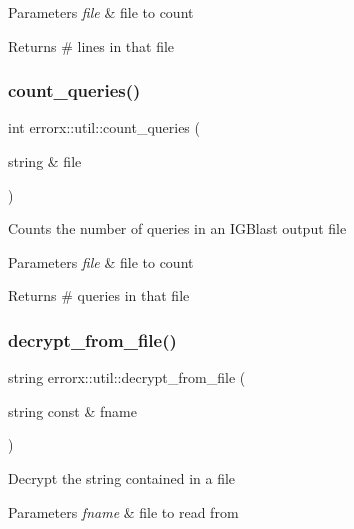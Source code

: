 \begin{DoxyParams}{Parameters}
{\em file} & file to count\\
\hline
\end{DoxyParams}
\begin{DoxyReturn}{Returns}
\# lines in that file 
\end{DoxyReturn}
\mbox{\label{util_8hh_file_a1085374a3cfcdff485fbce90b2aab7e4}} 
\subsubsection{\texorpdfstring{count\+\_\+queries()}{count\_queries()}}
{\footnotesize\ttfamily int errorx\+::util\+::count\+\_\+queries (\begin{DoxyParamCaption}\item[{string \&}]{file }\end{DoxyParamCaption})}

Counts the number of queries in an I\+G\+Blast output file


\begin{DoxyParams}{Parameters}
{\em file} & file to count\\
\hline
\end{DoxyParams}
\begin{DoxyReturn}{Returns}
\# queries in that file 
\end{DoxyReturn}
\mbox{\label{util_8hh_file_aead987c84e7d53e93fc89bf02b049d84}} 
\subsubsection{\texorpdfstring{decrypt\+\_\+from\+\_\+file()}{decrypt\_from\_file()}}
{\footnotesize\ttfamily string errorx\+::util\+::decrypt\+\_\+from\+\_\+file (\begin{DoxyParamCaption}\item[{string const \&}]{fname }\end{DoxyParamCaption})}

Decrypt the string contained in a file


\begin{DoxyParams}{Parameters}
{\em fname} & file to read from \\
\hline
\end{DoxyParams}
\mbox{\label{util_8hh_file_ad888231c11d2ab60d6dd197b5b8cc011}} 
